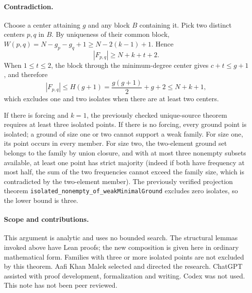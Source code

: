 \documentclass[11pt,letterpaper]{article}
\begin{document}
\paragraph{Contradiction.}
Choose a center attaining \(g\) and any block \(B\) containing it.
Pick two distinct centers \(p,q\) in \(B\). By uniqueness of their
common block,
\(W(p,q)=N-g_p-g_q+1\ge N-2(k-1)+1\). Hence
\[
 |F_{p,q}|\ge N+k+t+2.
\]
When \(1\le t\le2\), the block through the minimum-degree center
gives \(c+t\le g+1\), and therefore
\[
 |F_{p,q}|\le H(g+1)=\frac{g(g+1)}2+g+2\le N+k+1,
\]
which excludes one and two isolates when there are at least two centers.

If there is forcing and \(k=1\), the previously checked
unique-source theorem requires at least three isolated points.
If there is no forcing, every ground point is isolated; a ground
of size one or two cannot support a weak family. For size one,
its point occurs in every member. For size two, the two-element
ground set belongs to the family by union closure, and with at
most three nonempty subsets available, at least one point has
strict majority (indeed if both have frequency at most half, the
sum of the two frequencies cannot exceed the family size, which
is contradicted by the two-element member). The previously verified
projection theorem \texttt{isolated\_nonempty\_of\_weakMinimalGround}
excludes zero isolates, so the lower bound is three.

\paragraph{Scope and contributions.}
This argument is analytic and uses no bounded search. The structural
lemmas invoked above have Lean proofs; the new composition is
given here in ordinary mathematical form. Families with three or
more isolated points are not excluded by this theorem. Aafi Khan
Malek selected and directed the research. ChatGPT assisted with
proof development, formalization and writing. Codex was not used.
This note has not been peer reviewed.
\end{document}
